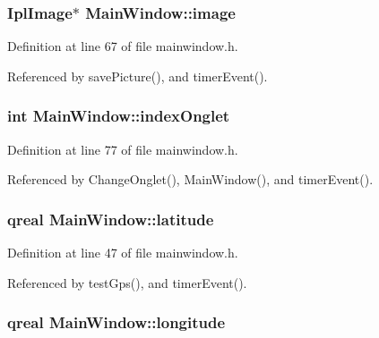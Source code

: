 \hypertarget{classMainWindow_aeb45155a2035daf28097e853724529a1}{
\subsubsection[{image}]{\setlength{\rightskip}{0pt plus 5cm}Ipl\-Image$\ast$ Main\-Window\-::image\hspace{0.3cm}{\ttfamily [private]}}}\label{classMainWindow_aeb45155a2035daf28097e853724529a1}


Definition at line 67 of file mainwindow.\-h.



Referenced by save\-Picture(), and timer\-Event().

\hypertarget{classMainWindow_a2cf797221c17fdcce7888b123bd5847b}{
\subsubsection[{index\-Onglet}]{\setlength{\rightskip}{0pt plus 5cm}int Main\-Window\-::index\-Onglet\hspace{0.3cm}{\ttfamily [private]}}}\label{classMainWindow_a2cf797221c17fdcce7888b123bd5847b}


Definition at line 77 of file mainwindow.\-h.



Referenced by Change\-Onglet(), Main\-Window(), and timer\-Event().

\hypertarget{classMainWindow_a8eb6f9adebecfb3cf78c566686f1f35e}{
\subsubsection[{latitude}]{\setlength{\rightskip}{0pt plus 5cm}qreal Main\-Window\-::latitude}}\label{classMainWindow_a8eb6f9adebecfb3cf78c566686f1f35e}


Definition at line 47 of file mainwindow.\-h.



Referenced by test\-Gps(), and timer\-Event().

\hypertarget{classMainWindow_ac7c0f22da72ad33678ff3d3e22c722c7}{
\subsubsection[{longitude}]{\setlength{\rightskip}{0pt plus 5cm}qreal Main\-Window\-::longitude}}\label{classMainWindow_ac7c0f22da72ad33678ff3d3e22c722c7}


